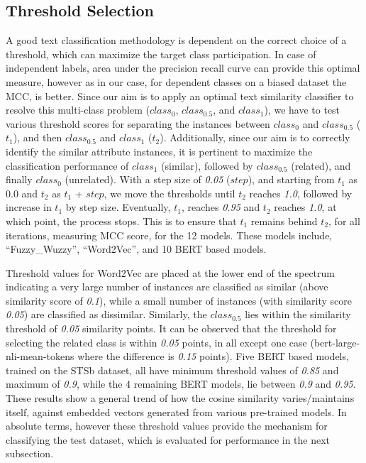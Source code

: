 \documentclass{ieeeaccess}
\begin{document}
\subsection{Threshold Selection}
A good text classification methodology is dependent on the correct choice of a threshold, which can maximize the target class participation. In case of independent labels, area under the precision recall curve can provide this optimal measure, however as in our case, for dependent classes on a biased dataset the MCC, is better\cite{chicco2020advantages}.
Since our aim is to apply an optimal text similarity classifier to resolve this multi-class problem ($class_0$, $class_{0.5}$, and $class_1$), we have to test various threshold scores for separating the instances between $class_0$ and $class_{0.5}$ ($t_1$), and then $class_{0.5}$ and $class_1$ ($t_2$). Additionally, since our aim is to correctly identify the similar attribute instances, it is pertinent to maximize the classification performance of $class_1$ (similar), followed by $class_{0.5}$ (related), and finally $class_0$ (unrelated).
With a step size of \textit{0.05} ($step$), and starting from $t_1$ as 0.0 and $t_2$ as $t_1$ + $step$, we move the thresholds until $t_2$ reaches \textit{1.0}, followed by increase in $t_1$ by step size. Eventually, $t_1$, reaches \textit{0.95} and $t_2$ reaches \textit{1.0}, at which point, the process stops. This is to ensure that $t_1$ remains behind $t_2$, for all iterations, measuring MCC score, for the 12 models. These models include, ``Fuzzy\_Wuzzy'', ``Word2Vec'', and 10 BERT based models.

Threshold values for Word2Vec are placed at the lower end of the spectrum indicating a very large number of instances are classified as similar (above similarity score of \textit{0.1}), while a small number of instances (with similarity score \textit{0.05}) are classified as dissimilar. Similarly, the $class_{0.5}$ lies within the similarity threshold of \textit{0.05} similarity points. It can be observed that the threshold for selecting the related class is within \textit{0.05} points, in all except one case (bert-large-nli-mean-tokens where the difference is \textit{0.15} points). Five BERT based models, trained on the STSb dataset, all have minimum threshold values of \textit{0.85} and maximum of \textit{0.9}, while the 4 remaining BERT models, lie between \textit{0.9} and \textit{0.95}. These results show a general trend of how the cosine similarity varies/maintains itself, against embedded vectors generated from various pre-trained models. In absolute terms, however these threshold values provide the mechanism for classifying the test dataset, which is evaluated for performance in the next subsection.
\end{document}
